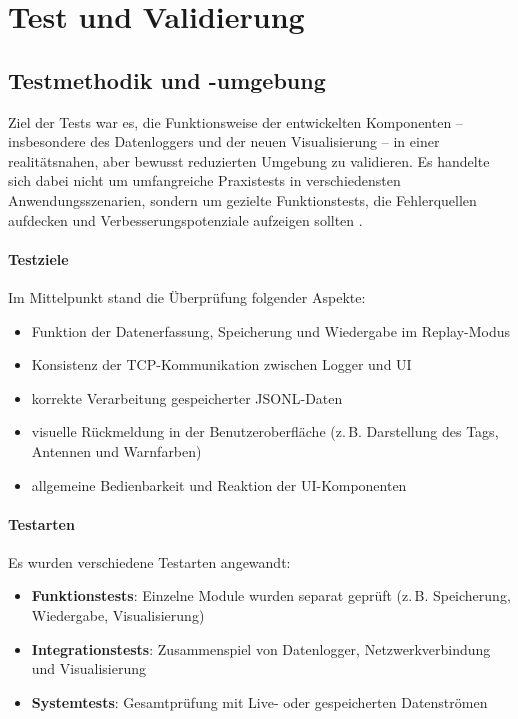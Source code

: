 \documentclass[a4paper, 12pt]{article} %
\begin{document}
\clearpage

\section{Test und Validierung}
\subsection{Testmethodik und -umgebung}

Ziel der Tests war es, die Funktionsweise der entwickelten Komponenten -- insbesondere des Datenloggers und der neuen Visualisierung -- in einer 
realitätsnahen, aber bewusst reduzierten Umgebung zu validieren. Es handelte sich dabei nicht um umfangreiche Praxistests in verschiedensten 
Anwendungsszenarien, sondern um gezielte Funktionstests, die Fehlerquellen aufdecken und Verbesserungspotenziale aufzeigen sollten \cite{myers_testing}.

\paragraph{Testziele}
Im Mittelpunkt stand die Überprüfung folgender Aspekte:
\begin{itemize}
    \item Funktion der Datenerfassung, Speicherung und Wiedergabe im Replay-Modus
    \item Konsistenz der \ac{TCP}-Kommunikation zwischen Logger und \ac{UI}
    \item korrekte Verarbeitung gespeicherter \ac{JSONL}-Daten
    \item visuelle Rückmeldung in der Benutzeroberfläche (z.\,B. Darstellung des Tags, Antennen und Warnfarben)
    \item allgemeine Bedienbarkeit und Reaktion der \ac{UI}-Komponenten \cite{nielsen_usability}
\end{itemize}

\paragraph{Testarten}
Es wurden verschiedene Testarten angewandt:
\begin{itemize}
    \item \textbf{Funktionstests}: Einzelne Module wurden separat geprüft (z.\,B. Speicherung, Wiedergabe, Visualisierung)
    \item \textbf{Integrationstests}: Zusammenspiel von Datenlogger, Netzwerkverbindung und Visualisierung
    \item \textbf{Systemtests}: Gesamtprüfung mit Live- oder gespeicherten Datenströmen
\end{itemize}
\end{document}
